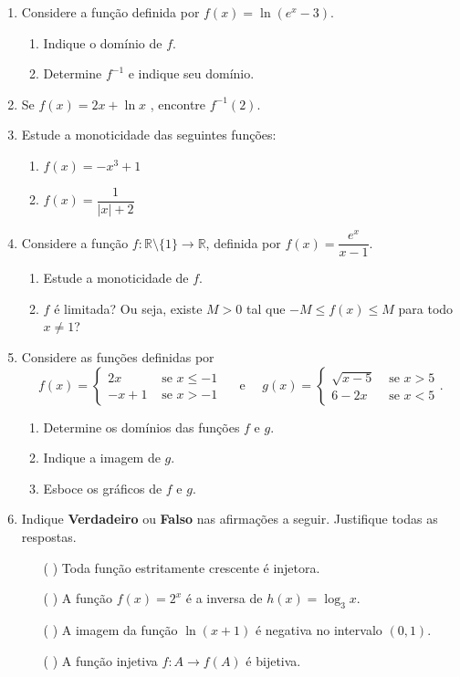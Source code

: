 \begin{enumerate}
\item Considere a função  definida por $f(x)=\ln{(e^x-3)}$.
\begin{enumerate}
    \item Indique o domínio de $f$.
    \item Determine $f^{-1}$ e indique seu domínio.
\end{enumerate}

\item Se $f(x)=2x + \ln{x}$ , encontre $f^{-1}(2)$.

\item Estude a monoticidade das seguintes funções:
\begin{enumerate}
    \item $f(x)=-x^3+1$
    \item $f(x)=\dfrac{1}{|x|+2}$
\end{enumerate}
\item Considere a função $f:\mathbb{R}\setminus\{1\}\longrightarrow \mathbb{R}$, definida por $f(x)=\dfrac{e^x}{x-1}$.
\begin{enumerate}
    \item Estude a monoticidade de $f$.
    \item $f$ é limitada? Ou seja, existe $M>0$ tal que $-M\leq f(x) \leq M$ para todo $x\neq 1$? 
\end{enumerate}


\item Considere as funções definidas por 
$$f(x)=\left\{\begin{array}{cl}
         2x   & \mbox{ se } x\leq -1    \\
         -x+1 & \mbox{ se } x>-1
       \end{array}
\right.
\quad \text{  e  }\quad
g(x) = \begin{cases}
\sqrt{x-5} & \text{ se } x>5\\
6-2x & \text{ se } x<5
\end{cases}
.$$

\begin{enumerate}
    \item Determine os domínios das funções $f$ e $g$.
    \item Indique a imagem de $g$.
    \item Esboce os gráficos de $f$ e $g$.
\end{enumerate}


\item Indique \textbf{Verdadeiro} ou \textbf{Falso} nas afirmações a seguir. Justifique todas as respostas.
\begin{enumerate}
\item[( )] Toda função estritamente crescente é injetora.
\item[( )] A função $f(x)=2^x$ é a inversa de $h(x)=\log_3x$.
\item[( )] A imagem da função $\ln (x+1)$ é negativa no intervalo $(0,1)$.
\item [( )]A função injetiva $f:A\longrightarrow f(A)$ é bijetiva.
\end{enumerate}



\end{enumerate}
